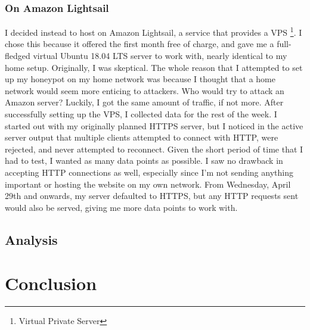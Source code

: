\documentclass[12pt]{article}
\begin{document}
\subsubsection{On Amazon Lightsail}
I decided instead to host on Amazon Lightsail, a service that provides a VPS \footnote{Virtual Private Server}.
I chose this because it offered the first month free of charge, and gave me a full-fledged virtual Ubuntu 18.04 LTS server to work with, nearly identical to my home setup.
Originally, I was skeptical.
The whole reason that I attempted to set up my honeypot on my home network was because I thought that a home network would seem more enticing to attackers.
Who would try to attack an Amazon server?
Luckily, I got the same amount of traffic, if not more.
After successfully setting up the VPS, I collected data for the rest of the week.
I started out with my originally planned HTTPS server, but I noticed in the active server output that multiple clients attempted to connect with HTTP, were rejected, and never attempted to reconnect.
Given the short period of time that I had to test, I wanted as many data points as possible.
I saw no drawback in accepting HTTP connections as well, especially since I'm not sending anything important or hosting the website on my own network.
From Wednesday, April 29th and onwards, my server defaulted to HTTPS, but any HTTP requests sent would also be served, giving me more data points to work with.


\subsection{Analysis}




\section{Conclusion}

\clearpage
\printbibliography
\end{document}
